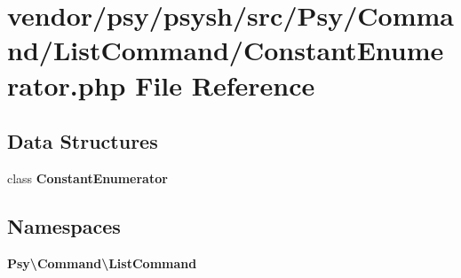 \section{vendor/psy/psysh/src/\+Psy/\+Command/\+List\+Command/\+Constant\+Enumerator.php File Reference}
\label{_constant_enumerator_8php}
\subsection*{Data Structures}
\begin{DoxyCompactItemize}
\item 
class {\bf Constant\+Enumerator}
\end{DoxyCompactItemize}
\subsection*{Namespaces}
\begin{DoxyCompactItemize}
\item 
 {\bf Psy\textbackslash{}\+Command\textbackslash{}\+List\+Command}
\end{DoxyCompactItemize}
